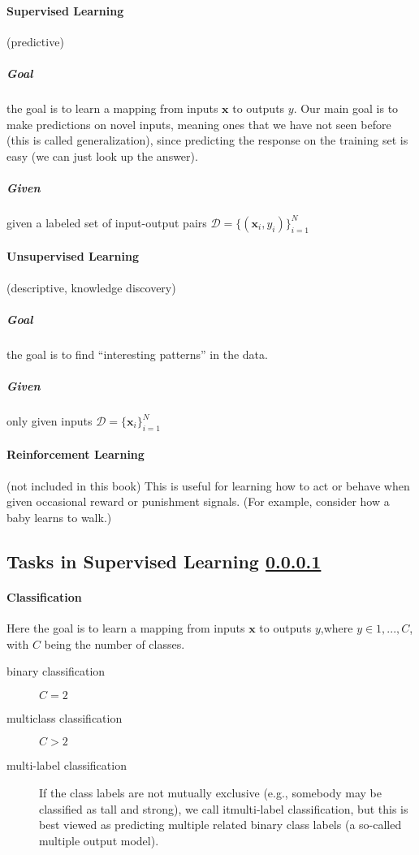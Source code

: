 \documentclass[11pt,a4paper]{article}
\begin{document}
\paragraph{Supervised Learning}\label{Supervised Learning}
(predictive)
\subparagraph{Goal}
the goal is to learn a mapping from inputs $\mathbf{x}$ to outputs $y$.
\newline
Our main goal is to make predictions on novel inputs, meaning ones that we have not seen before (this is called generalization), 
since predicting the response on the training set is easy (we can just look up the answer).
\subparagraph{Given}
given a labeled set of input-output pairs $\mathcal{D}=\{(\mathbf{x}_i,y_i)\}^N_{i=1}$

\paragraph{Unsupervised Learning}
(descriptive, knowledge discovery)
\subparagraph{Goal}
the goal is to find “interesting patterns” in the data.
\subparagraph{Given}
only given inputs $\mathcal{D}=\{\mathbf{x}_i\}^N_{i=1}$

\paragraph{Reinforcement Learning}
(not included in this book)
This is useful for learning how to act or behave when given occasional reward or punishment signals. 
(For example, consider how a baby learns to walk.)

\subsection{Tasks in Supervised Learning \ref{Supervised Learning}}

\paragraph{Classification}
Here the goal is to learn a mapping from inputs $\mathbf{x}$ to outputs $y$,where $y∈{1,...,C}$, with $C$ being the number of classes.
\begin{description}
 \item [binary classification] $C=2$
 \item [multiclass classification] $C>2$
 \item [multi-label classification] If the class labels are not mutually exclusive (e.g., somebody may be
classified as tall and strong), we call itmulti-label classification, but this is best viewed as
predicting multiple related binary class labels (a so-called multiple output model).
\end{description}
\end{document}
